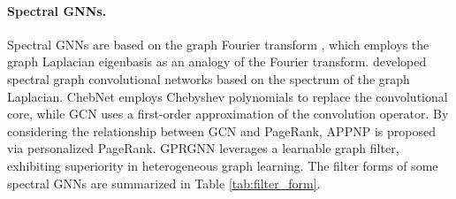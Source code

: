 \documentclass[letterpaper]{article} \usepackage{aaai24}
\theoremstyle{plain}
\theoremstyle{definition}
\theoremstyle{remark}
\begin{document}
\paragraph{Spectral GNNs.} 
Spectral GNNs are based on the graph Fourier transform \cite{graphFourier2013}, which employs the graph Laplacian eigenbasis as an analogy of the Fourier transform. 
\citet{Bruna2014} developed spectral graph convolutional networks based on the spectrum of the graph Laplacian.
ChebNet \cite{ChebNet} employs Chebyshev polynomials to replace the convolutional core, while GCN \cite{GCN} uses a first-order approximation of the convolution operator.
By considering the relationship between GCN and PageRank, APPNP \cite{APPNP} is proposed via personalized PageRank.
GPRGNN \cite{GPRGNN} leverages a learnable graph filter, exhibiting superiority in heterogeneous graph learning.
The filter forms of some spectral GNNs are summarized in Table \ref{tab:filter_form}. 



\begin{table*}[!t]
\centering
\renewcommand\tabcolsep{1pt} 
\caption{The filter forms of spectral graph convolutional networks.}
\label{tab:filter_form}
\end{table*}
\end{document}
